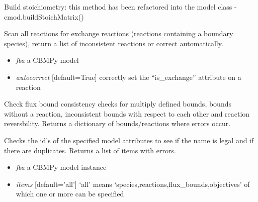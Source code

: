 \documentclass[a4paper,11pt,english]{sphinxmanual}
\begin{document}
\begin{fulllineitems}
\label{modules_doc:cbmpy.CBTools.addStoichToFBAModel}
Build stoichiometry: this method has been refactored into the model class - cmod.buildStoichMatrix()

\end{fulllineitems}


\begin{fulllineitems}
\label{modules_doc:cbmpy.CBTools.checkExchangeReactions}
Scan all reactions for exchange reactions (reactions containing a boundary species), return a list of
inconsistent reactions or correct automatically.
\begin{itemize}
\item {} 
\emph{fba} a CBMPy model

\item {} 
\emph{autocorrect} {[}default=True{]} correctly set the ``is\_exchange'' attribute on a reaction

\end{itemize}

\end{fulllineitems}


\begin{fulllineitems}
\label{modules_doc:cbmpy.CBTools.checkFluxBoundConsistency}
Check flux bound consistency checks for multiply defined bounds, bounds without a reaction, inconsistent bounds with respect to each other
and reaction reversbility. Returns a dictionary of bounds/reactions where errors occur.

\end{fulllineitems}


\begin{fulllineitems}
\label{modules_doc:cbmpy.CBTools.checkIds}
Checks the id's of the specified model attributes to see if the name is legal and if there are duplicates.
Returns a list of items with errors.
\begin{itemize}
\item {} 
\emph{fba} a CBMPy model instance

\item {} 
\emph{items} {[}default='all'{]} `all' means `species,reactions,flux\_bounds,objectives' of which one or more can be specified

\end{itemize}

\end{fulllineitems}
\end{document}
